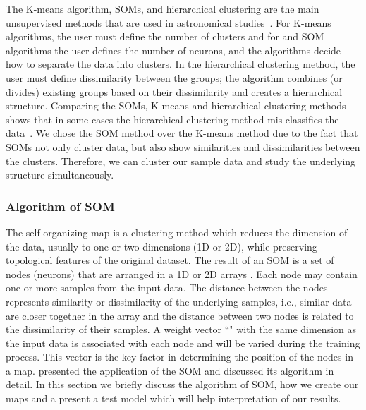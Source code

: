 The K-means algorithm, SOMs, and hierarchical clustering are the main unsupervised methods that are used in astronomical studies~\citep[e.g.][]{DAbrusco12, Aycha16}.
For K-means algorithms, the user must define the number of clusters and for and SOM algorithms the user defines the number of neurons, and the algorithms decide how to separate the data into clusters.
In the hierarchical clustering method, the user must define dissimilarity between the groups; the algorithm combines (or divides) existing groups based on their dissimilarity and creates a hierarchical structure. 
Comparing the SOMs, K-means and hierarchical clustering methods shows that in some cases the hierarchical clustering method mis-classifies the data~\citep[][and references therein]{Mangiameli96}.
We chose the SOM method over the K-means method due to the fact that SOMs not only cluster data, but also show similarities and dissimilarities between the clusters.
Therefore, we can cluster our sample data and study the underlying structure simultaneously.

     
    \subsubsection{Algorithm of SOM} 
   \label{sec: algorithm_somz}
    The self-organizing map is a clustering method which reduces the dimension of the data, usually to one or two dimensions (1D or 2D), while preserving topological features of the original dataset.
    The result of an SOM is a set of nodes (neurons) that are arranged in a 1D or 2D arrays \citep{Kohonen98}. 
    Each node may contain one or more samples from the input data.
    The distance between the nodes represents similarity or dissimilarity of the underlying samples, i.e., similar data are closer together in the array and the distance between two nodes is related to the dissimilarity of their samples.
    A weight vector ``" with the same dimension as the input data is associated with each node and will be varied during the training process.
    This vector is the key factor in determining the position of the nodes in a map.
    \cite{Geach12} presented the application of the SOM and discussed its algorithm in detail.
    In this section we briefly discuss the algorithm of SOM, how we create our maps and a present a test model which will help interpretation of our results. 
   
